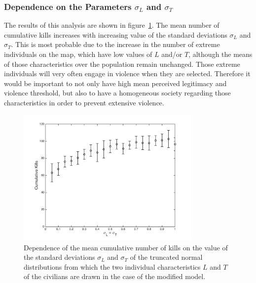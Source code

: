 \documentclass[11pt]{article}
\begin{document}
\subsubsection{Dependence on the Parameters $\sigma_L$ and $\sigma_T$}
The results of this analysis are shown in figure~\ref{fig:L_T_std_dep}. The mean number of cumulative kills increases with increasing value of the standard deviations $\sigma_L$ and $\sigma_T$. This is most probable due to the increase in the number of extreme individuals on the map, which have low values of $L$ and/or $T$, although the means of those characteristics over the population remain unchanged. Those extreme individuals will very often engage in violence when they are selected. Therefore it would be important to not only have high mean perceived legitimacy and violence threshold, but also to have a homogeneous society regarding those characteristics in order to prevent extensive violence.
\begin{figure}[!htbp]
	\centering
		\includegraphics[width=0.80\textwidth]{../../code/modified_model/L_T_std_dep.png}
	\caption{Dependence of the mean cumulative number of kills on the value of the standard deviations $\sigma_L$ and $\sigma_T$ of the truncated normal distributions from which the two individual characteristics $L$ and $T$ of the civilians are drawn in the case of the modified model.}
	\label{fig:L_T_std_dep}
\end{figure}
\end{document}
